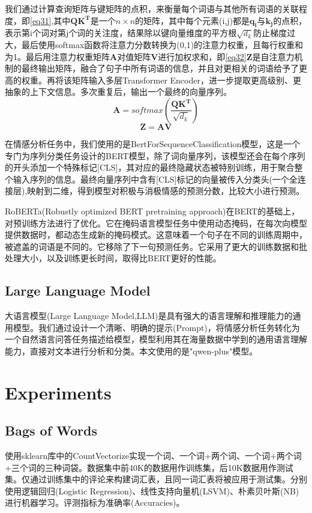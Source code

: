 \documentclass{article}
\begin{document}
我们通过计算查询矩阵与键矩阵的点积，来衡量每个词语与其他所有词语的关联程度，即\eqref{eq31},其中$\boldsymbol{QK^T}$是一个$n\times n$的矩阵，其中每个元素(i,j)都是$\boldsymbol{q_i}$与$\boldsymbol{k_j}$的点积，表示第i个词对第j个词的关注度，结果除以键向量维度的平方根$\sqrt{d_k}$防止梯度过大，最后使用softmax函数将注意力分数转换为(0,1)的注意力权重，且每行权重和为1。最后用注意力权重矩阵$\boldsymbol{A}$对值矩阵$\boldsymbol{V}$进行加权求和，即\eqref{eq32}$\boldsymbol{Z}$是自注意力机制的最终输出矩阵，融合了句子中所有词语的信息，并且对更相关的词语给予了更高的权重。再将该矩阵输入多层Transformer Encoder，进一步提取更高级别、更抽象的上下文信息。多次重复后，输出一个最终的向量序列。
\begin{equation}
    \boldsymbol{A}=softmax(\frac{\boldsymbol{QK^T}}{\sqrt{d_k}}) \label{eq31}
\end{equation}
\begin{equation}
    \boldsymbol{Z}=\boldsymbol{AV} \label{eq32}
\end{equation}

在情感分析任务中，我们使用的是BertForSequenceClassification模型，这是一个专门为序列分类任务设计的BERT模型，除了词向量序列，该模型还会在每个序列的开头添加一个特殊标记[CLS]，其对应的最终隐藏状态被特别训练，用于聚合整个输入序列的信息。最终向量序列中含有[CLS]标记的向量被传入分类头(一个全连接层),映射到二维，得到模型对积极与消极情感的预测分数，比较大小进行预测。

RoBERTa(Robustly optimized BERT pretraining approach)在BERT的基础上，对预训练方法进行了优化。它在掩码语言模型任务中使用动态掩码，在每次向模型提供数据时，都动态生成新的掩码模式。这意味着一个句子在不同的训练周期中，被遮盖的词语是不同的。它移除了下一句预测任务。它采用了更大的训练数据和批处理大小，以及训练更长时间，取得比BERT更好的性能。

\subsection{Large Language Model}
大语言模型(Large Language Model,LLM)是具有强大的语言理解和推理能力的通用模型。我们通过设计一个清晰、明确的提示(Prompt)，将情感分析任务转化为一个自然语言问答任务描述给模型，模型利用其在海量数据中学到的通用语言理解能力，直接对文本进行分析和分类。本文使用的是"qwen-plus"模型。

\section{Experiments}

\subsection{Bags of Words}
使用sklearn库中的CountVectorize实现一个词、一个词+两个词、一个词+两个词+三个词的三种词袋。数据集中前40K的数据用作训练集，后10K数据用作测试集。仅通过训练集中的评论来构建词汇表，且同一词汇表将被应用于测试集。分别使用逻辑回归(Logistic Regression)、线性支持向量机(LSVM)、朴素贝叶斯(NB)进行机器学习。评测指标为准确率(Accuracies)。
\end{document}
